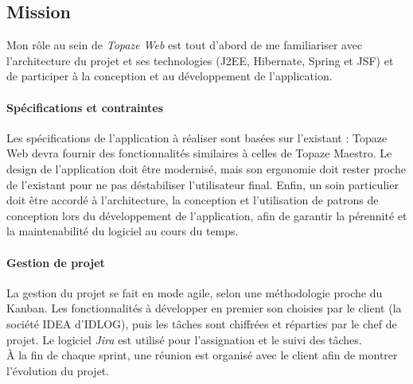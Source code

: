 \subsection{Mission}
Mon rôle au sein de \textit{Topaze Web} est tout d'abord de me familiariser avec l'architecture du projet et ses technologies (J2EE, Hibernate, Spring et JSF) et de participer à la conception et au développement de l'application. 

\paragraph{Spécifications et contraintes\\}
Les spécifications de l’application à réaliser sont basées sur l'existant : Topaze Web devra
fournir des fonctionnalités similaires à celles de Topaze Maestro. Le design de l'application doit être modernisé, mais son ergonomie doit rester proche de l'existant pour ne pas déstabiliser l'utilisateur final. Enfin, un soin particulier doit être accordé à l'architecture, la conception et l'utilisation de patrons de conception lors du développement de l'application, afin de garantir la pérennité et la maintenabilité du logiciel au cours du temps. 


\paragraph{Gestion de projet\\}
La gestion du projet se fait en mode agile, selon une méthodologie proche du Kanban. 
Les fonctionnalités à développer en premier son choisies par le client (la société IDEA d'IDLOG), puis les tâches sont chiffrées et réparties par le chef de projet. Le logiciel \textit{Jira} est utilisé pour l'assignation et le suivi des tâches. \\
À la fin de chaque sprint, une réunion est organisé avec le client afin de montrer l'évolution du projet.


